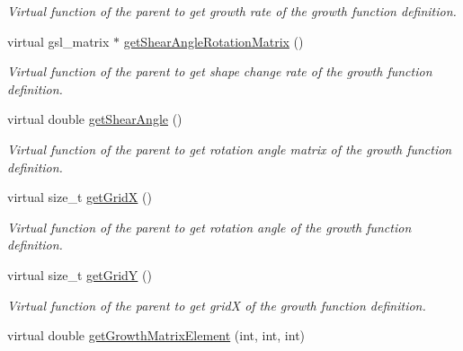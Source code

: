 \begin{DoxyCompactItemize}
\begin{DoxyCompactList}\small\item\em Virtual function of the parent to get growth rate of the growth function definition. \end{DoxyCompactList}\item 
\hypertarget{classGrowthFunctionBase_a3c0d71849d020d29832b1aaaba87065e}{}virtual gsl\+\_\+matrix $\ast$ \hyperlink{classGrowthFunctionBase_a3c0d71849d020d29832b1aaaba87065e}{get\+Shear\+Angle\+Rotation\+Matrix} ()\label{classGrowthFunctionBase_a3c0d71849d020d29832b1aaaba87065e}

\begin{DoxyCompactList}\small\item\em Virtual function of the parent to get shape change rate of the growth function definition. \end{DoxyCompactList}\item 
\hypertarget{classGrowthFunctionBase_adea116613ddb2edb7ebc0734d17c9226}{}virtual double \hyperlink{classGrowthFunctionBase_adea116613ddb2edb7ebc0734d17c9226}{get\+Shear\+Angle} ()\label{classGrowthFunctionBase_adea116613ddb2edb7ebc0734d17c9226}

\begin{DoxyCompactList}\small\item\em Virtual function of the parent to get rotation angle matrix of the growth function definition. \end{DoxyCompactList}\item 
\hypertarget{classGrowthFunctionBase_ad8c9e61ea66d17a08a015d82b671bf14}{}virtual size\+\_\+t \hyperlink{classGrowthFunctionBase_ad8c9e61ea66d17a08a015d82b671bf14}{get\+Grid\+X} ()\label{classGrowthFunctionBase_ad8c9e61ea66d17a08a015d82b671bf14}

\begin{DoxyCompactList}\small\item\em Virtual function of the parent to get rotation angle of the growth function definition. \end{DoxyCompactList}\item 
\hypertarget{classGrowthFunctionBase_afad54b4f721fa45b030f3eac3f3f7615}{}virtual size\+\_\+t \hyperlink{classGrowthFunctionBase_afad54b4f721fa45b030f3eac3f3f7615}{get\+Grid\+Y} ()\label{classGrowthFunctionBase_afad54b4f721fa45b030f3eac3f3f7615}

\begin{DoxyCompactList}\small\item\em Virtual function of the parent to get grid\+X of the growth function definition. \end{DoxyCompactList}\item 
\hypertarget{classGrowthFunctionBase_aa70ed3e1b142f733364b8543e26e4ef8}{}virtual double \hyperlink{classGrowthFunctionBase_aa70ed3e1b142f733364b8543e26e4ef8}{get\+Growth\+Matrix\+Element} (int, int, int)\label{classGrowthFunctionBase_aa70ed3e1b142f733364b8543e26e4ef8}


\end{DoxyCompactItemize}
